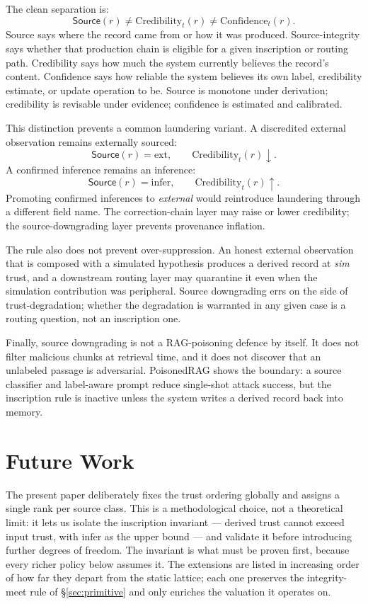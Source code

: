 \documentclass[11pt]{article}
\newcommand{\Source}{\mathsf{Source}}
\newcommand{\ext}{\ensuremath{\mathrm{ext}}}
\newcommand{\infer}{\ensuremath{\mathrm{infer}}}
\begin{document}
The clean separation is:
\[
\Source(r) \neq \mathrm{Credibility}_t(r) \neq \mathrm{Confidence}_t(r).
\]
Source says where the record came from or how it was produced. Source-integrity says whether that production chain is eligible for a given inscription or routing path. Credibility says how much the system currently believes the record's content. Confidence says how reliable the system believes its own label, credibility estimate, or update operation to be. Source is monotone under derivation; credibility is revisable under evidence; confidence is estimated and calibrated.

This distinction prevents a common laundering variant. A discredited external observation remains externally sourced:
\[
\Source(r)=\ext,
\qquad
\mathrm{Credibility}_t(r)\downarrow.
\]
A confirmed inference remains an inference:
\[
\Source(r)=\infer,
\qquad
\mathrm{Credibility}_t(r)\uparrow.
\]
Promoting confirmed inferences to \emph{external} would reintroduce laundering through a different field name. The correction-chain layer may raise or lower credibility; the source-downgrading layer prevents provenance inflation.

The rule also does not prevent over-suppression. An honest external observation that is composed with a simulated hypothesis produces a derived record at \emph{sim} trust, and a downstream routing layer may quarantine it even when the simulation contribution was peripheral. Source downgrading errs on the side of trust-degradation; whether the degradation is warranted in any given case is a routing question, not an inscription one.

Finally, source downgrading is not a RAG-poisoning defence by itself. It does not filter malicious chunks at retrieval time, and it does not discover that an unlabeled passage is adversarial. PoisonedRAG shows the boundary: a source classifier and label-aware prompt reduce single-shot attack success, but the inscription rule is inactive unless the system writes a derived record back into memory.

\section{Future Work}
\label{sec:future}

The present paper deliberately fixes the trust ordering globally and assigns a single rank per source class. This is a methodological choice, not a theoretical limit: it lets us isolate the inscription invariant --- derived trust cannot exceed input trust, with $\infer$ as the upper bound --- and validate it before introducing further degrees of freedom. The invariant is what must be proven first, because every richer policy below assumes it. The extensions are listed in increasing order of how far they depart from the static lattice; each one preserves the integrity-meet rule of \S\ref{sec:primitive} and only enriches the valuation it operates on.
\end{document}

